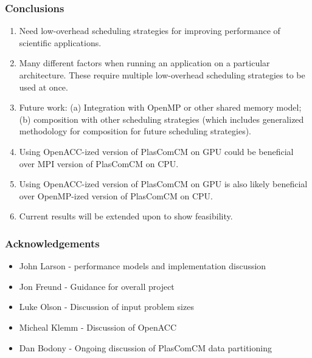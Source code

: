 \begin{frame} 
\frametitle{Conclusions}
\begin{enumerate} 
  \small \item \small Need low-overhead scheduling strategies for
      improving performance of scientific applications.
    \item \small Many different factors when running an application on a particular architecture. These require multiple low-overhead scheduling strategies to be used at once.
   \item \small Future work: (a) Integration with OpenMP or other
      shared memory model; (b) composition with other scheduling
      strategies (which includes generalized methodology for composition for future scheduling strategies). 
\item \small Using OpenACC-ized version of PlasComCM on GPU could be
beneficial over MPI version of PlasComCM on CPU. 
\small \item \small Using OpenACC-ized version of PlasComCM on GPU is
also likely beneficial over OpenMP-ized version of PlasComCM on CPU. 
\item \small Current results will be extended upon to show feasibility. 
\end{enumerate} 
\end{frame} 


\begin{frame}[label=ack] 
  \frametitle{Acknowledgements}
  \begin{itemize}
  \item John Larson - performance models and implementation discussion
  \item Jon Freund - Guidance for overall project
  \item Luke Olson - Discussion of input problem sizes
  \item Micheal Klemm - Discussion of OpenACC
  \item Dan Bodony -  Ongoing discussion of PlasComCM data partitioning
  \end{itemize}
\end{frame} 

